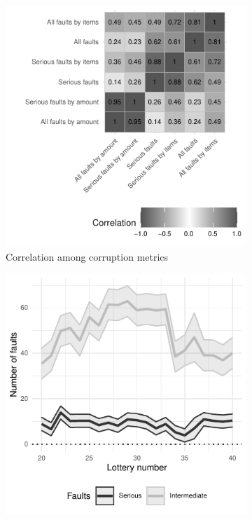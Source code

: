 {\begin{figure}[H]
    \centering
    \begin{subfigure}[b]{0.49\textwidth}
        \centering
        \includegraphics{chapters/chapter_2/figures/corruptionCorrelation}
        \caption{Correlation among corruption metrics}
        \label{fig:corruptionCorrelation}
    \end{subfigure}
    \begin{subfigure}[b]{0.49\textwidth}
         \centering
         \includegraphics{chapters/chapter_2/figures/corruptionOverTime}

\end{subfigure}
\end{figure}}
